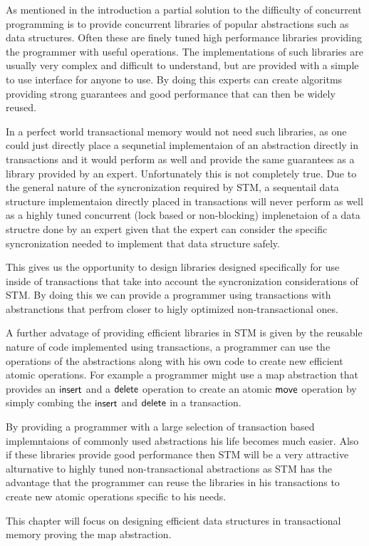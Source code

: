 
As mentioned in the introduction a partial solution to the difficulty of concurrent programming
is to provide concurrent libraries of popular abstractions such as data structures.
Often these are finely tuned high performance libraries
providing the programmer with useful operations.
The implementations of such libraries are usually very complex
and difficult to understand, but are provided with a simple to use
interface for anyone to use.
By doing this experts can create algoritms providing strong guarantees
and good performance that can then be widely reused.

In a perfect world transactional memory would not need such libraries,
as one could just directly place a sequnetial implementaion of an abstraction
directly in transactions and it would perform as well and provide the same
guarantees as a library provided by an expert.
Unfortunately this is not completely true.
Due to the general nature
of the syncronization required by STM, a sequentail data structure implementaion directly
placed in transactions will never perform as well as a highly tuned concurrent
(lock based or non-blocking) implenetaion of a data structre done by an expert
given that the expert can consider the specific syncronization needed to implement
that data structure safely.

This gives us the opportunity to design libraries designed specifically for use inside
of transactions that take into account the syncronization considerations
of STM.
By doing this we can provide a programmer using transactions with abstranctions that perfrom closer
to higly optimized non-transactional ones.

A further advatage of providing efficient libraries in STM is given by the reusable nature of code implemented using
transactions, a programmer can use the operations of the abstractions along with his own code
to create new efficient atomic operations.
For example a programmer might use a map abstraction that provides an $\lit{insert}$ and a $\lit{delete}$ operation
to create an atomic $\lit{move}$ operation by simply combing the $\lit{insert}$ and $\lit{delete}$ in a transaction.

By providing a programmer with a large selection of transaction based implemntaions of commonly used abstractions
his life becomes much easier.
Also if these libraries provide good performance then STM will be a very attractive alturnative to highly tuned
non-transactional abstractions as STM has the advantage that the programmer can reuse the libraries in his transactions to create new
atomic operations specific to his needs.

This chapter will focus on designing efficient data structures in transactional memory proving the map abstraction.